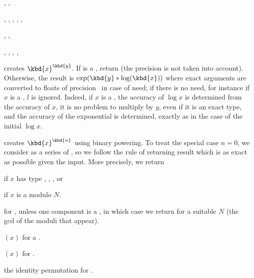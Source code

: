 , ,

, ,
, ,
,

, ,

, ,
, ,

 creates $\kbd{x}^{\kbd{y}}$. If
 is a , return  (the precision  is not
taken into account). Otherwise, the result is $\exp(\kbd{y}*\log(\kbd{x}))$
where exact arguments are converted to floats of precision~ in case of
need; if there is no need, for instance if $x$ is a , $l$ is
ignored. Indeed, if $x$ is a , the accuracy of $\log x$ is
determined from the accuracy of $x$, it is no problem to multiply by $y$,
even if it is an exact type, and the accuracy of the exponential is
determined, exactly as in the case of the initial $\log x$.

 creates $\kbd{x}^{\kbd{n}}$ using
binary powering. To treat the special case $n = 0$, we consider
 as a series of , so we follow the rule of returning
result which is as exact as possible given the input. More precisely,
we return

\item {} if $x$ has type , ,  , or

\item {} if $x$ is a  modulo $N$.

\item {} for ,  unless one component
is a , in which case we return  for a suitable
$N$ (the gcd of the moduli that appear).

\item {}$(x)$ for a .

\item {}$(x)$ for .

\item the identity permutation for .

